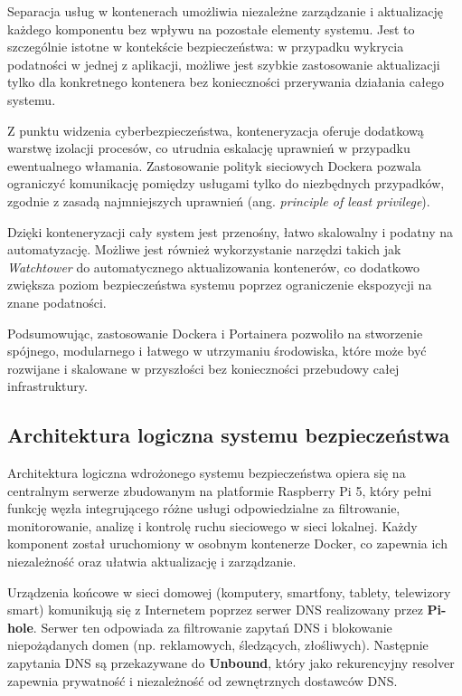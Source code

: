 \documentclass[
    left=2.5cm,         %
    right=2.5cm,        %
    top=2.5cm,          %
    bottom=3cm,         %
    bindingoffset=6mm,  %
    nohyphenation=true %
]{eiti/eiti-thesis} %
\begin{document}
Separacja usług w kontenerach umożliwia niezależne zarządzanie i aktualizację każdego komponentu bez wpływu na pozostałe elementy systemu. Jest to szczególnie istotne w kontekście bezpieczeństwa: w przypadku wykrycia podatności w jednej z aplikacji, możliwe jest szybkie zastosowanie aktualizacji tylko dla konkretnego kontenera bez konieczności przerywania działania całego systemu.

Z punktu widzenia cyberbezpieczeństwa, konteneryzacja oferuje dodatkową warstwę izolacji procesów, co utrudnia eskalację uprawnień w przypadku ewentualnego włamania. Zastosowanie polityk sieciowych Dockera pozwala ograniczyć komunikację pomiędzy usługami tylko do niezbędnych przypadków, zgodnie z zasadą najmniejszych uprawnień (ang. \textit{principle of least privilege}).

Dzięki konteneryzacji cały system jest przenośny, łatwo skalowalny i podatny na automatyzację. Możliwe jest również wykorzystanie narzędzi takich jak \textit{Watchtower} do automatycznego aktualizowania kontenerów, co dodatkowo zwiększa poziom bezpieczeństwa systemu poprzez ograniczenie ekspozycji na znane podatności.

Podsumowując, zastosowanie Dockera i Portainera pozwoliło na stworzenie spójnego, modularnego i łatwego w utrzymaniu środowiska, które może być rozwijane i skalowane w przyszłości bez konieczności przebudowy całej infrastruktury.

\subsection{Architektura logiczna systemu bezpieczeństwa}
Architektura logiczna wdrożonego systemu bezpieczeństwa opiera się na centralnym serwerze zbudowanym na platformie Raspberry Pi 5, który pełni funkcję węzła integrującego różne usługi odpowiedzialne za filtrowanie, monitorowanie, analizę i kontrolę ruchu sieciowego w sieci lokalnej. Każdy komponent został uruchomiony w osobnym kontenerze Docker, co zapewnia ich niezależność oraz ułatwia aktualizację i zarządzanie.

Urządzenia końcowe w sieci domowej (komputery, smartfony, tablety, telewizory smart) komunikują się z Internetem poprzez serwer DNS realizowany przez \textbf{Pi-hole}. Serwer ten odpowiada za filtrowanie zapytań DNS i blokowanie niepożądanych domen (np. reklamowych, śledzących, złośliwych). Następnie zapytania DNS są przekazywane do \textbf{Unbound}, który jako rekurencyjny resolver zapewnia prywatność i niezależność od zewnętrznych dostawców DNS.
\end{document}
